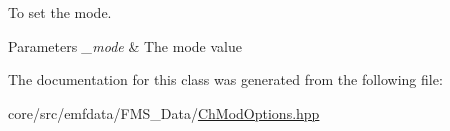 To set the mode. 


\begin{DoxyParams}{Parameters}
{\em \_\-mode} & The mode value \\
\hline
\end{DoxyParams}


The documentation for this class was generated from the following file:\begin{DoxyCompactItemize}
\item 
core/src/emfdata/FMS\_\-Data/\hyperlink{ChModOptions_8hpp}{ChModOptions.hpp}\end{DoxyCompactItemize}
